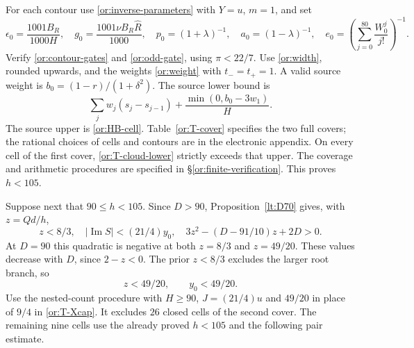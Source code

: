 \documentclass[11pt,reqno]{amsart}
\numberwithin{equation}{section}
\theoremstyle{definition}
\theoremstyle{remark}
\renewcommand{\Im}{\operatorname{Im}}
\begin{document}
For each contour use \eqref{or:inverse-parameters} with $Y=u$, $m=1$,
and set
\begin{equation}\label{or:automatic-contour}
 \epsilon_0=\frac{1001B_R}{1000H},\quad
 g_0=\frac{1001\nu B_R\widehat R}{1000},\quad
 p_0=(1+\lambda)^{-1},\quad a_0=(1-\lambda)^{-1},\quad
 e_0=\left(\sum_{j=0}^{80}\frac{W_0^j}{j!}\right)^{-1}.
\end{equation}
Verify \eqref{or:contour-gates} and \eqref{or:odd-gate}, using
$\pi<22/7$.  Use \eqref{or:width}, rounded upwards, and the weights
\eqref{or:weight} with $t_-=t_+=1$.  A valid source weight is
$b_0=(1-r)/(1+\delta^2)$.  The source lower bound is
\begin{equation}\label{or:T-cloud-lower}
  \sum_jw_j(s_j-s_{j-1})+\frac{\min(0,b_0-3w_1)}H.
\end{equation}
The source upper is \eqref{or:HB-cell}.  Table~\ref{or:T-cover}
specifies the two full covers; the rational choices of cells and
contours are in the electronic appendix.  On every cell of the first
cover, \eqref{or:T-cloud-lower} strictly exceeds that upper.  The
coverage and arithmetic procedures are specified in
\S\ref{or:finite-verification}.  This proves $h<105$.

Suppose next that $90\le h<105$.  Since $D>90$,
Proposition~\ref{lt:D70} gives, with $z=Qd/h$,
\[
 z<8/3,\quad |\Im S|<(21/4)y_0,\quad
                   3z^2-(D-91/10)z+2D>0.
\]
At $D=90$ this quadratic is negative at both $z=8/3$ and $z=49/20$.
These values decrease with $D$, since $2-z<0$.  The prior
$z<8/3$ excludes the larger root branch, so
\begin{equation}\label{or:T-ratio245}
                           z<49/20,\qquad y_0<49/20.
\end{equation}
Use the nested-count procedure with $H\ge90$, $J=(21/4)u$ and
$49/20$ in place of $9/4$ in \eqref{or:T-Xcap}.
It excludes $26$ closed cells of the second cover.  The remaining
nine cells use the already proved $h<105$ and the following pair
estimate.
\end{document}
